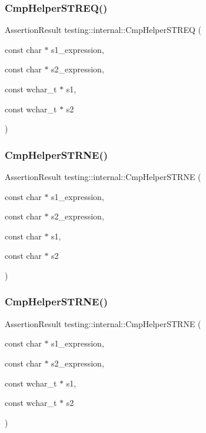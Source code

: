 \subsubsection{\texorpdfstring{CmpHelperSTREQ()}{CmpHelperSTREQ()}\hspace{0.1cm}{\footnotesize\ttfamily [2/2]}}
{\footnotesize\ttfamily Assertion\+Result testing\+::internal\+::\+Cmp\+Helper\+S\+T\+R\+EQ (\begin{DoxyParamCaption}\item[{const char $\ast$}]{s1\+\_\+expression,  }\item[{const char $\ast$}]{s2\+\_\+expression,  }\item[{const wchar\+\_\+t $\ast$}]{s1,  }\item[{const wchar\+\_\+t $\ast$}]{s2 }\end{DoxyParamCaption})}

\mbox{\label{namespacetesting_1_1internal_af2d31c77ce73e1003a64bd7ca3564bbe}} 
\subsubsection{\texorpdfstring{CmpHelperSTRNE()}{CmpHelperSTRNE()}\hspace{0.1cm}{\footnotesize\ttfamily [1/2]}}
{\footnotesize\ttfamily Assertion\+Result testing\+::internal\+::\+Cmp\+Helper\+S\+T\+R\+NE (\begin{DoxyParamCaption}\item[{const char $\ast$}]{s1\+\_\+expression,  }\item[{const char $\ast$}]{s2\+\_\+expression,  }\item[{const char $\ast$}]{s1,  }\item[{const char $\ast$}]{s2 }\end{DoxyParamCaption})}

\mbox{\label{namespacetesting_1_1internal_a415a953647bbc9469f062dc966061efb}} 
\subsubsection{\texorpdfstring{CmpHelperSTRNE()}{CmpHelperSTRNE()}\hspace{0.1cm}{\footnotesize\ttfamily [2/2]}}
{\footnotesize\ttfamily Assertion\+Result testing\+::internal\+::\+Cmp\+Helper\+S\+T\+R\+NE (\begin{DoxyParamCaption}\item[{const char $\ast$}]{s1\+\_\+expression,  }\item[{const char $\ast$}]{s2\+\_\+expression,  }\item[{const wchar\+\_\+t $\ast$}]{s1,  }\item[{const wchar\+\_\+t $\ast$}]{s2 }\end{DoxyParamCaption})}

